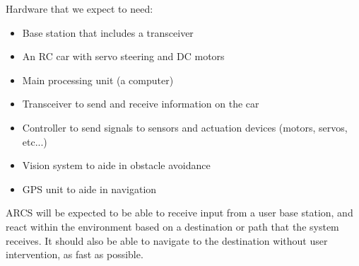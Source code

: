 \documentclass[compsoc,draftclsnofoot,onecolumn,10pt]{IEEEtran}
\begin{document}
Hardware that we expect to need:
\begin{itemize} 
\item Base station that includes a transceiver
\item An RC car with servo steering and DC motors
\item Main processing unit (a computer)
\item Transceiver to send and receive information on the car
\item Controller to send signals to sensors and actuation devices (motors, servos, etc...) 
\item Vision system to aide in obstacle avoidance
\item GPS unit to aide in navigation
\end{itemize}

ARCS will be expected to be able to receive input from a user base station, and react
within the environment based on a destination or path that the system receives. It should also
be able to navigate to the destination without user intervention, as fast as possible. \par
\end{document}
